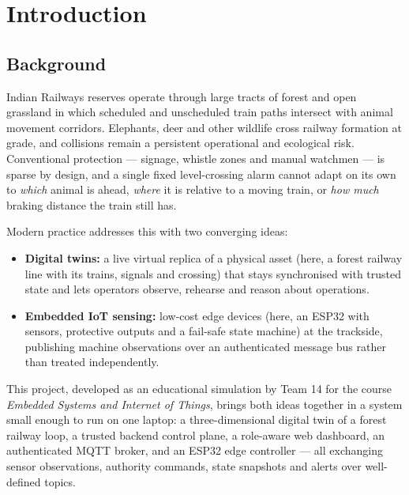 \chapter{Introduction}\label{cha:introduction}

\section{Background}

Indian Railways reserves operate through large tracts of forest and open
grassland in which scheduled and unscheduled train paths intersect with
animal movement corridors. Elephants, deer and other wildlife cross
railway formation at grade, and collisions remain a persistent operational
and ecological risk. Conventional protection --- signage, whistle zones and
manual watchmen --- is sparse by design, and a single fixed level-crossing
alarm cannot adapt on its own to \emph{which} animal is ahead, \emph{where}
it is relative to a moving train, or \emph{how much} braking distance the
train still has.

Modern practice addresses this with two converging ideas:

\begin{itemize}
  \item \textbf{Digital twins:} a live virtual replica of a physical asset
        (here, a forest railway line with its trains, signals and crossing)
        that stays synchronised with trusted state and lets operators
        observe, rehearse and reason about operations.
  \item \textbf{Embedded IoT sensing:} low-cost edge devices (here, an
        ESP32 with sensors, protective outputs and a fail-safe state
        machine) at the trackside, publishing machine observations over an
        authenticated message bus rather than treated independently.
\end{itemize}

This project, developed as an educational simulation by Team 14 for the
course \emph{Embedded Systems and Internet of Things}, brings both ideas
together in a system small enough to run on one laptop: a three-dimensional
digital twin of a forest railway loop, a trusted backend control plane, a
role-aware web dashboard, an authenticated MQTT broker, and an ESP32 edge
controller --- all exchanging sensor observations, authority commands,
state snapshots and alerts over well-defined topics.

